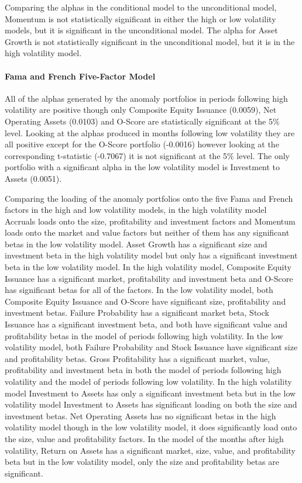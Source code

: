 \documentclass[12pt, a4paper, oneside]{article}
\begin{document}
Comparing the alphas in the conditional model to the unconditional model, Momentum is not statistically significant in either the high or low volatility models, but it is significant in the unconditional model. The alpha for Asset Growth is not statistically significant in the unconditional model, but it is in the high volatility model.

\paragraph{Fama and French Five-Factor Model}
All of the alphas generated by the anomaly portfolios in periods following high volatility are positive though only Composite Equity Issuance (0.0059), Net Operating Assets (0.0103) and O-Score are statistically significant at the 5\% level. Looking at the alphas produced in months following low volatility they are all positive except for the O-Score portfolio (-0.0016) however looking at the corresponding t-statistic (-0.7067) it is not significant at the 5\% level. The only portfolio with a significant alpha in the low volatility model is Investment to Assets (0.0051).

Comparing the loading of the anomaly portfolios onto the five Fama and French factors in the high and low volatility models, in the high volatility model Accruals loads onto the size, profitability and investment factors and Momentum loads onto the market and value factors but neither of them has any significant betas in the low volatility model. Asset Growth has a significant size and investment beta in the high volatility model but only has a significant investment beta in the low volatility model. In the high volatility model, Composite Equity Issuance has a significant market, profitability and investment beta and O-Score has significant betas for all of the factors. In the low volatility model, both Composite Equity Issuance and O-Score have significant size, profitability and investment betas. Failure Probability has a significant market beta, Stock Issuance has a significant investment beta, and both have significant value and profitability betas in the model of periods following high volatility. In the low volatility model, both Failure Probability and Stock Issuance have significant size and profitability betas. Gross Profitability has a significant market, value, profitability and investment beta in both the model of periods following high volatility and the model of periods following low volatility. In the high volatility model Investment to Assets has only a significant investment beta but in the low volatility model Investment to Assets has significant loading on both the size and investment betas. Net Operating Assets has no significant betas in the high volatility model though in the low volatility model, it does significantly load onto the size, value and profitability factors. In the model of the months after high volatility, Return on Assets has a significant market, size, value, and profitability beta but in the low volatility model, only the size and profitability betas are significant. 
\end{document}
